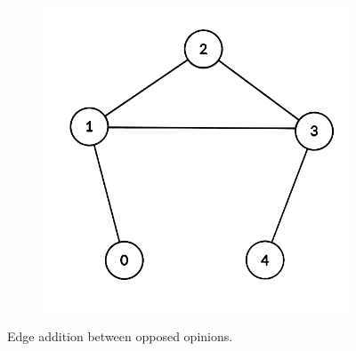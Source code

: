 \begin{figure}[h]
\begin{subfigure}[t]{0.3\textwidth}
		\includegraphics[height=0.15\textheight]{Figures/p5B}
		\caption{}
		\label{subfig:monotonicityB}
	\end{subfigure}
	\vspace{40pt}
	\hfill
	\caption{Edge addition between opposed opinions.}
	\label{fig:p5}
\end{figure}
\\

